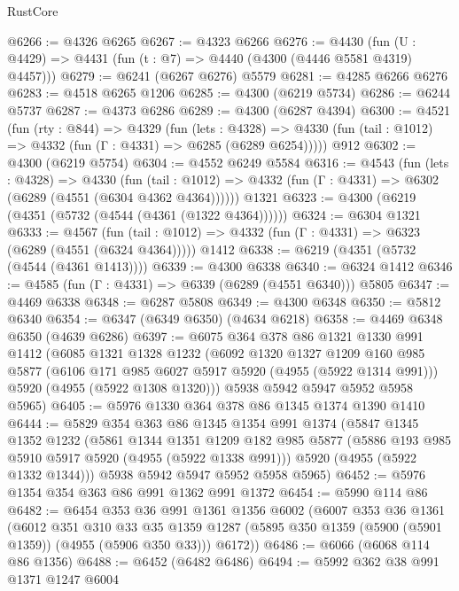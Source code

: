 \begin{lexlean}{RustCore}
\begin{coremodule}
@6266 := @4326 @6265
@6267 := @4323 @6266
@6276 := @4430 (fun (U : @4429) => @4431 (fun (t : @7) => @4440 (@4300 (@4446 @5581 @4319) @4457)))
@6279 := @6241 (@6267 @6276) @5579
@6281 := @4285 @6266 @6276
@6283 := @4518 @6265 @1206
@6285 := @4300 (@6219 @5734)
@6286 := @6244 @5737
@6287 := @4373 @6286
@6289 := @4300 (@6287 @4394)
@6300 := @4521
    (fun (rty : @844) =>
    @4329
      (fun (lets : @4328) =>
      @4330 (fun (tail : @1012) => @4332 (fun (Γ : @4331) => @6285 (@6289 @6254)))))
    @912
@6302 := @4300 (@6219 @5754)
@6304 := @4552 @6249 @5584
@6316 := @4543
    (fun (lets : @4328) =>
    @4330
      (fun (tail : @1012) => @4332 (fun (Γ : @4331) => @6302 (@6289 (@4551 (@6304 @4362 @4364))))))
    @1321
@6323 := @4300 (@6219 (@4351 (@5732 (@4544 (@4361 (@1322 @4364))))))
@6324 := @6304 @1321
@6333 := @4567
    (fun (tail : @1012) => @4332 (fun (Γ : @4331) => @6323 (@6289 (@4551 (@6324 @4364)))))
    @1412
@6338 := @6219 (@4351 (@5732 (@4544 (@4361 @1413))))
@6339 := @4300 @6338
@6340 := @6324 @1412
@6346 := @4585 (fun (Γ : @4331) => @6339 (@6289 (@4551 @6340))) @5805
@6347 := @4469 @6338
@6348 := @6287 @5808
@6349 := @4300 @6348
@6350 := @5812 @6340
@6354 := @6347 (@6349 @6350) (@4634 @6218)
@6358 := @4469 @6348 @6350 (@4639 @6286)
@6397 := @6075
    @364
    @378
    @86
    @1321
    @1330
    @991
    @1412
    (@6085
      @1321
      @1328
      @1232
      (@6092
        @1320
        @1327
        @1209
        @160
        @985
        @5877
        (@6106 @171 @985 @6027 @5917 @5920 (@4955 (@5922 @1314 @991)))
        @5920
        (@4955 (@5922 @1308 @1320)))
      @5938
      @5942
      @5947
      @5952
      @5958
      @5965)
@6405 := @5976 @1330 @364 @378 @86 @1345 @1374 @1390 @1410
@6444 := @5829
    @354
    @363
    @86
    @1345
    @1354
    @991
    @1374
    (@5847
      @1345
      @1352
      @1232
      (@5861
        @1344
        @1351
        @1209
        @182
        @985
        @5877
        (@5886 @193 @985 @5910 @5917 @5920 (@4955 (@5922 @1338 @991)))
        @5920
        (@4955 (@5922 @1332 @1344)))
      @5938
      @5942
      @5947
      @5952
      @5958
      @5965)
@6452 := @5976 @1354 @354 @363 @86 @991 @1362 @991 @1372
@6454 := @5990 @114 @86
@6482 := @6454
    @353
    @36
    @991
    @1361
    @1356
    @6002
    (@6007
      @353
      @36
      @1361
      (@6012
        @351
        @310
        @33
        @35
        @1359
        @1287
        (@5895 @350 @1359 (@5900 (@5901 @1359)) (@4955 (@5906 @350 @33)))
        @6172))
@6486 := @6066 (@6068 @114 @86 @1356)
@6488 := @6452 (@6482 @6486)
@6494 := @5992 @362 @38 @991 @1371 @1247 @6004

\end{coremodule}
\end{lexlean}
